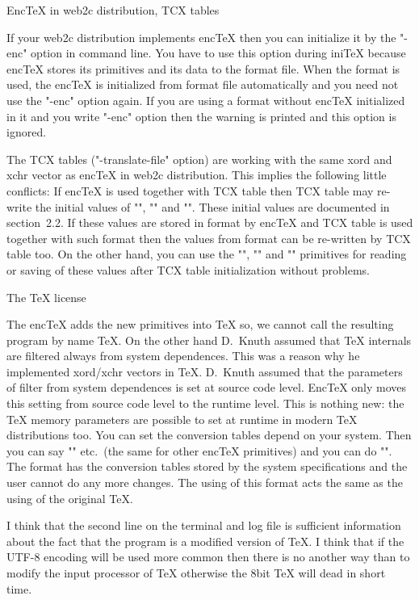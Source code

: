 \sec Enc\TeX{} in web2c distribution, TCX tables

If your web2c distribution implements enc\TeX{} then you can
initialize it by the "-enc" option in command line.
You have to use this option during ini\TeX{} because enc\TeX{} stores
its primitives and its data to the format file. When the format is
used, the enc\TeX{} is initialized from format file automatically and
you need not use the "-enc" option again. If you are using a format
without enc\TeX{} initialized in it and you write "-enc" option then
the warning is printed and this option is ignored.

The TCX tables ("-translate-file" option) are working with the same
xord and xchr vector as enc\TeX{} in web2c distribution. This implies
the following little conflicts: If enc\TeX{} is used together with TCX
table then TCX table may re-write the initial values of "\xordcode",
"\xchrcode" and "\xprncode". These initial values are documented in
section~2.2. If these values are stored in format by enc\TeX{} and TCX
table is used together with such format then the values from format
can be re-written by TCX table too. On the other hand, you can use the
"\xordcode", "\xchrcode" and "\xprncode" primitives for reading or
saving of these values after TCX table initialization without
problems.

\sec The \TeX{} license

The enc\TeX{} adds the new primitives into \TeX{} so, we cannot call
the resulting program by name \TeX. On the other hand D.~Knuth assumed
that \TeX{} internals are filtered always from system dependences. 
This was a reason why he implemented xord/xchr vectors in \TeX.
D.~Knuth assumed that the parameters of filter from system
dependences is set at source code level. Enc\TeX{} only moves this
setting from source code level to the runtime level. This is nothing
new: the \TeX{} memory parameters are possible to set at runtime in
modern \TeX{} distributions too. You can set the conversion tables
depend on your system. Then you can say "\let\xordcode=\undefined" 
etc.~(the same for other enc\TeX{} primitives) and you can do "\dump".
The format has the conversion tables stored by the system
specifications and the user cannot do any more changes. The using of
this format acts the same as the using of the original \TeX{}.

I think that the second line on the terminal and log file is
sufficient information about the fact that the program is
a modified version of \TeX. I think that if the UTF-8 encoding will be
used more common then there is no another way than to modify the input
processor of \TeX{} otherwise the 8bit \TeX{} will dead in short time. 

